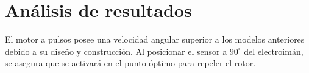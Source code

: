 \section{An\'alisis de resultados}
El motor a pulsos posee una velocidad angular superior a los modelos anteriores debido a su dise\~no 
y construcci\'on. Al posicionar el sensor a $90^\circ$ del electroim\'an, se asegura que se activar\'a en el punto \'optimo
para repeler el rotor.
